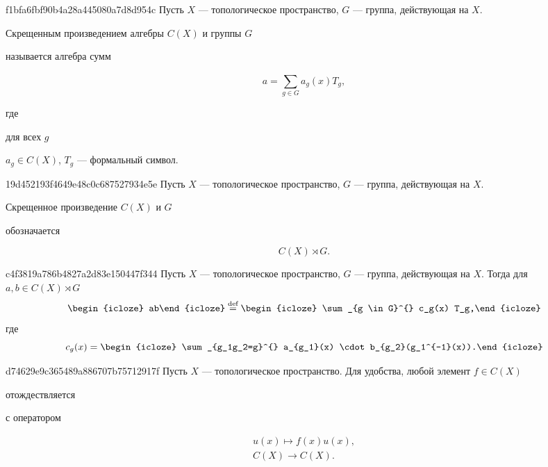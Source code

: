 \begin{note}{f1bfa6fbf90b4a28a445080a7d8d954c}
    Пусть \({ X }\) --- топологическое пространство, \({ G }\) --- группа, действующая на \({ X }\).
    \begin{icloze}{3}Скрещенным произведением алгебры \({ C(X) }\) и группы \({ G }\)\end{icloze} называется алгебра сумм
    \begin{icloze}{1}
        \[
            a = \sum_{g \in G}^{} a_{g}(x) T_{g},
        \]
    \end{icloze}
    где
    \begin{icloze}{2}
        для всех \({ g }\)
        \begin{center}
            \({ a_{g} \in C(X) }\), \quad \({ T_{g} }\) --- формальный символ.
        \end{center}
    \end{icloze}
\end{note}

\begin{note}{19d452193f4649e48c0c687527934e5e}
    Пусть \({ X }\) --- топологическое пространство, \({ G }\) --- группа, действующая на \({ X }\).
    \begin{icloze}{2}Скрещенное произведение \({ C(X) }\) и \({ G }\)\end{icloze} обозначается
    \begin{icloze}{1}
        \[
            C(X) \rtimes G.
        \]
    \end{icloze}
\end{note}

\begin{note}{c4f3819a786b4827a2d83e150447f344}
    Пусть \({ X }\) --- топологическое пространство, \({ G }\) --- группа, действующая на \({ X }\).
    Тогда для \({ a, b \in C(X) \rtimes G }\)
    \[
        \begin{icloze}{3}ab\end{icloze} \overset{\text{def}}= \begin{icloze}{2}\sum_{g \in G}^{} c_g(x) T_g,\end{icloze}
    \]
    где
    \[
        c_g(x) = \begin{icloze}{1}\sum_{g_1g_2=g}^{} a_{g_1}(x) \cdot b_{g_2}(g_1^{-1}(x)).\end{icloze}
    \]
\end{note}
\begin{note}{d74629e9c365489a886707b75712917f}
    Пусть \({ X }\) --- топологическое пространство.
    Для удобства, любой элемент \({ f \in C(X) }\) \begin{icloze}{2}отождествляется\end{icloze} с оператором
    \begin{icloze}{1}
        \[
            \begin{gathered}
                u(x) \mapsto f(x) u(x), \\
                C(X) \to C(X).
            \end{gathered}
        \]
    \end{icloze}
\end{note}

